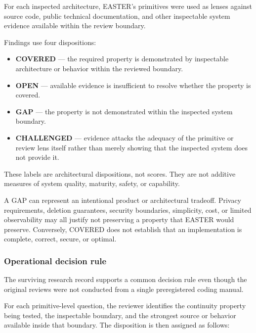 \documentclass[11pt]{article}
\begin{document}
For each inspected architecture, EASTER's primitives were used as lenses against source code, public technical documentation, and other inspectable system evidence available within the review boundary.

Findings use four dispositions:

\begin{itemize}
\item \textbf{COVERED} --- the required property is demonstrated by inspectable architecture or behavior within the reviewed boundary.
\item \textbf{OPEN} --- available evidence is insufficient to resolve whether the property is covered.
\item \textbf{GAP} --- the property is not demonstrated within the inspected system boundary.
\item \textbf{CHALLENGED} --- evidence attacks the adequacy of the primitive or review lens itself rather than merely showing that the inspected system does not provide it.
\end{itemize}

These labels are architectural dispositions, not scores. They are not additive measures of system quality, maturity, safety, or capability.

A GAP can represent an intentional product or architectural tradeoff. Privacy requirements, deletion guarantees, security boundaries, simplicity, cost, or limited observability may all justify not preserving a property that EASTER would preserve. Conversely, COVERED does not establish that an implementation is complete, correct, secure, or optimal.

\subsubsection{Operational decision rule}

The surviving research record supports a common decision rule even though the original reviews were not conducted from a single preregistered coding manual.

For each primitive-level question, the reviewer identifies the continuity property being tested, the inspectable boundary, and the strongest source or behavior available inside that boundary. The disposition is then assigned as follows:
\end{document}
